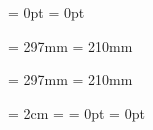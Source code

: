 




\unprotect


\voffset = 0pt %
\hoffset = 0pt %


\newdimen\papierhoogte       \papierhoogte         = 297mm
\newdimen\papierbreedte      \papierbreedte        = 210mm

\newdimen\printpapierhoogte  \printpapierhoogte    = 297mm
\newdimen\printpapierbreedte \printpapierbreedte   = 210mm

\newdimen\zethoogte                                %
\newdimen\zetbreedte                               %

\newdimen\teksthoogte                              %
\newdimen\tekstbreedte                             %

\newdimen\kopwit              \kopwit              = 2cm
\newdimen\rugwit              \rugwit              = \kopwit
\newdimen\snijwit             \snijwit             = 0pt
\newdimen\bodemwit            \bodemwit            = 0pt

